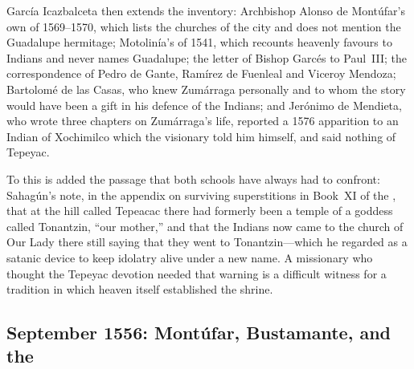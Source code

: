 Garc\'ia Icazbalceta then extends the inventory: Archbishop
Alonso de Mont\'ufar's own  of
1569--1570, which lists the churches of the city and does not mention
the Guadalupe hermitage; Motolin\'ia's 
of 1541, which recounts heavenly favours to Indians and never names
Guadalupe; the letter of Bishop Garc\'es to Paul~III; the
correspondence of Pedro de Gante, Ram\'irez de Fuenleal and Viceroy
Mendoza; Bartolom\'e de las Casas, who knew Zum\'arraga personally
and to whom the story would have been a gift in his defence of the
Indians; and Jer\'onimo de Mendieta, who wrote three chapters on
Zum\'arraga's life, reported a 1576 apparition to an Indian of
Xochimilco which the visionary told him himself, and said nothing of
Tepeyac.

To this is added the passage that both schools have always had to
confront: Sahag\'un's note, in the appendix on surviving
superstitions in Book~XI of the , that at the
hill called Tepeacac there had formerly been a temple of a goddess
called Tonantzin, ``our mother,'' and that the Indians now came to
the church of Our Lady there still saying that they went to
Tonantzin---which he regarded as a satanic device to keep idolatry
alive under a new name. A missionary who thought the Tepeyac
devotion needed that warning is a difficult witness for a tradition
in which heaven itself established the shrine.

\subsection{September 1556: Mont\'ufar, Bustamante, and the
}

